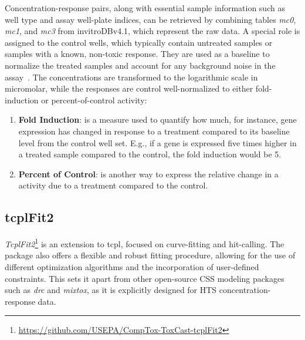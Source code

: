 Concentration-response pairs, along with essential sample information such as well type and assay well-plate indices, can be retrieved by combining tables \emph{mc0}, \emph{mc1}, and \emph{mc3} from invitroDBv4.1, which represent the raw data. A special role is assigned to the control wells, which typically contain untreated samples or samples with a known, non-toxic response. They are used as a baseline to normalize the treated samples and account for any background noise in the assay~\cite{sheffield2021}. The concentrations are transformed to the logarithmic scale in micromolar, while the responses are control well-normalized to either fold-induction or percent-of-control activity:

\begin{enumerate}
    \item \textbf{Fold Induction}: is a measure used to quantify how much, for instance, gene expression has changed in response to a treatment compared to its baseline level from the control well set. E.g., if a gene is expressed five times higher in a treated sample compared to the control, the fold induction would be 5.
    \item \textbf{Percent of Control}: is another way to express the relative change in a activity due to a treatment compared to the control.
\end{enumerate}


\subsection{tcplFit2}\label{sec:tcplfit2}
\emph{TcplFit2}\footnote{\url{https://github.com/USEPA/CompTox-ToxCast-tcplFit2}} is an extension to tcpl, focused on curve-fitting and hit-calling. The package also offers a flexible and robust fitting procedure, allowing for the use of different optimization algorithms and the incorporation of user-defined constraints. This sets it apart from other open-source CSS modeling packages such as \emph{drc} and \emph{mixtox}, as it is explicitly designed for HTS concentration-response data.

